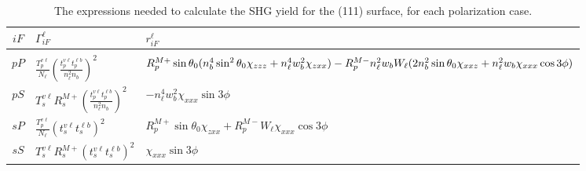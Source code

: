 \documentclass[10pt]{book}
\begin{document}
\begin{table}[t]
\centering
\begin{tabular}{ | c | p{80pt} | p{210pt} | }
\hline
$iF$ & $\Gamma^{\ell}_{iF}$ & $r^{\ell}_{iF}$ \\
\hline
&&\\
$pP$ &
$\frac{T^{v\ell}_{p}}{N_{\ell}}
\left(\frac{t^{v\ell}_{p}t^{\ell b}_{p}}{n^{2}_{\ell}n_{b}}\right)^{2}$ &
{\small
$R^{M+}_{p}\sin\theta_{0}
(n^{4}_{b}\sin^{2}\theta_{0}\chi_{zzz} + n^{4}_{\ell}w^{2}_{b}\chi_{zxx})
\newline- R^{M-}_{p}n^{2}_{\ell}w_{b}W_{\ell}
(2n^{2}_{b}\sin\theta_{0}\chi_{xxz} + n^{2}_{\ell}w_{b}\chi_{xxx}\cos3\phi)$
}
\\[3pt]
$pS$ &
$T_{s}^{v\ell}R^{M+}_{s}
\left(\frac{t^{v\ell}_{p}t^{\ell b}_{p}}{n^{2}_{\ell}n_{b}}\right)^{2}$ &
$-n^{4}_{\ell}w^{2}_{b}\chi_{xxx}\sin3\phi$
\\[15pt]
$sP$ &
$\frac{T^{v\ell}_{p}}{N_{\ell}}\left(t^{v\ell}_{s}t^{\ell b}_{s}\right)^{2}$ &
$R^{M+}_{p}\sin\theta_{0}\chi_{zxx} + R^{M-}_{p}W_{\ell}\chi_{xxx}\cos3\phi$
\\[15pt]
$sS$ & 
$T_{s}^{v\ell}R^{M+}_{s}\left(t^{v\ell}_{s}t^{\ell b}_{s}\right)^{2}$ &
$\chi_{xxx}\sin3\phi$
\\[15pt]
\hline
\end{tabular}
\caption{The expressions needed to calculate the SHG yield for the (111)
surface, for each polarization case.\label{tab:summary}}
\end{table}

\appendix







\end{document}
